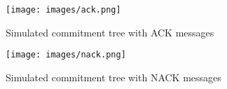
\begin{figure}[t]
	\centering
		\texttt{[image: images/ack.png]}\\
		\caption{Simulated commitment tree with ACK messages}
	\label{fig:figure1}
\end{figure}

\begin{figure}[t]
	\centering
		\texttt{[image: images/nack.png]}\\
		\caption[Simulated commitment tree with NACK messages]{Simulated commitment tree with NACK messages}
	\label{fig:figure1}
\end{figure}